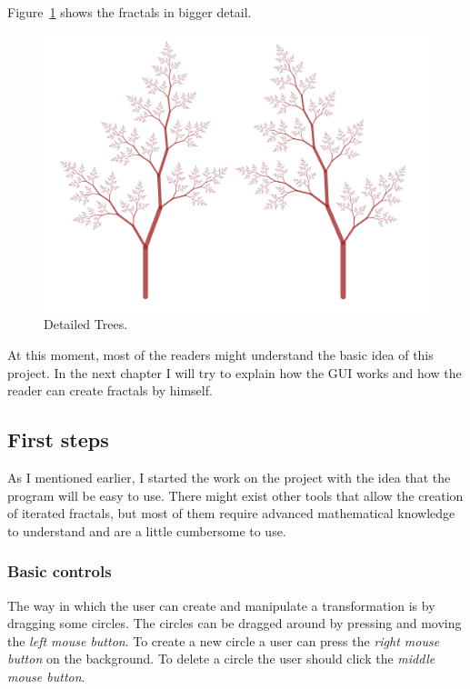         Figure~\ref{med05} shows the fractals in bigger detail.

        \begin{figure}[ht]
            \caption{\label{med05} Detailed Trees.}
            \centering
            \includegraphics[width=\textwidth]{img/med05.png}
        \end{figure}

        \FloatBarrier

        At this moment, most of the readers might understand the basic idea of this project.
        In the next chapter I will try to explain how the GUI works and how the reader can create fractals by himself.

    \subsection{First steps}

        As I mentioned earlier, I started the work on the project with the idea that the program will be easy to use.
        There might exist other tools that allow the creation of iterated fractals, but most of them require advanced mathematical knowledge to understand and are a little cumbersome to use.

        \subsubsection{Basic controls}

            The way in which the user can create and manipulate a transformation is by dragging some circles.
            The circles can be dragged around by pressing and moving the \emph{left mouse button}.
            To create a new circle a user can press the \emph{right mouse button} on the background.
            To delete a circle the user should click the \emph{middle mouse button}.

